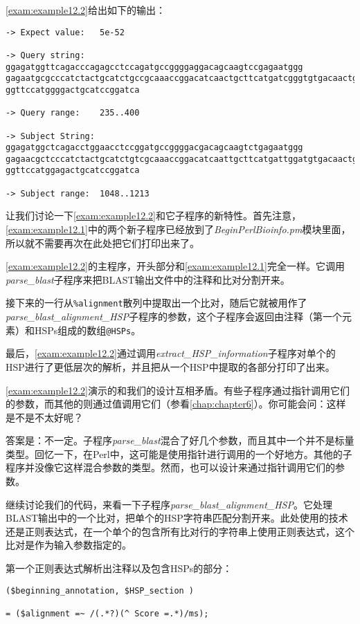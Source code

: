 \autoref{exam:example12.2}给出如下的输出：

\begin{lstlisting}
-> Expect value:   5e-52

-> Query string:   ggagatggttcagacccagagcctccagatgccggggaggacagcaagtccgagaatggg
gagaatgcgcccatctactgcatctgccgcaaaccggacatcaactgcttcatgatcgggtgtgacaactgcaatgagt
ggttccatggggactgcatccggatca

-> Query range:    235..400

-> Subject String: ggagatggctcagacctggaacctccggatgccggggacgacagcaagtctgagaatggg
gagaacgctcccatctactgcatctgtcgcaaaccggacatcaattgcttcatgattggatgtgacaactgcaacgagt
ggttccatggagactgcatccggatca

-> Subject range:  1048..1213
\end{lstlisting}

让我们讨论一下\autoref{exam:example12.2}和它子程序的新特性。首先注意，\autoref{exam:example12.1}中的两个新子程序已经放到了\textit{BeginPerlBioinfo.pm}模块里面，所以就不需要再次在此处把它们打印出来了。

\autoref{exam:example12.2}的主程序，开头部分和\autoref{exam:example12.1}完全一样。它调用\textit{parse\_blast}子程序来把BLAST输出文件中的注释和比对分割开来。

接下来的一行从\verb|%alignment|散列中提取出一个比对，随后它就被用作了\textit{parse\_blast\_alignment\_HSP}子程序的参数，这个子程序会返回由注释（第一个元素）和HSPs组成的数组\verb|@HSPs|。

最后，\autoref{exam:example12.2}通过调用\textit{extract\_HSP\_information}子程序对单个的HSP进行了更低层次的解析，并且把从一个HSP中提取的各部分打印了出来。

\autoref{exam:example12.2}演示的和我们的设计互相矛盾。有些子程序通过指针调用它们的参数，而其他的则通过值调用它们（参看\autoref{chap:chapter6}）。你可能会问：这样是不是不太好呢？

答案是：不一定。子程序\textit{parse\_blast}混合了好几个参数，而且其中一个并不是标量类型。回忆一下，在Perl中，这可能是使用指针进行调用的一个好地方。其他的子程序并没像它这样混合参数的类型。然而，也可以设计来通过指针调用它们的参数。

继续讨论我们的代码，来看一下子程序\textit{parse\_blast\_alignment\_HSP}。它处理BLAST输出中的一个比对，把单个的HSP字符串匹配分割开来。此处使用的技术还是正则表达式，在一个单个的包含所有比对行的字符串上使用正则表达式，这个比对是作为输入参数指定的。

第一个正则表达式解析出注释以及包含HSPs的部分：

\begin{lstlisting}
($beginning_annotation, $HSP_section )

= ($alignment =~ /(.*?)(^ Score =.*)/ms);
\end{lstlisting}

